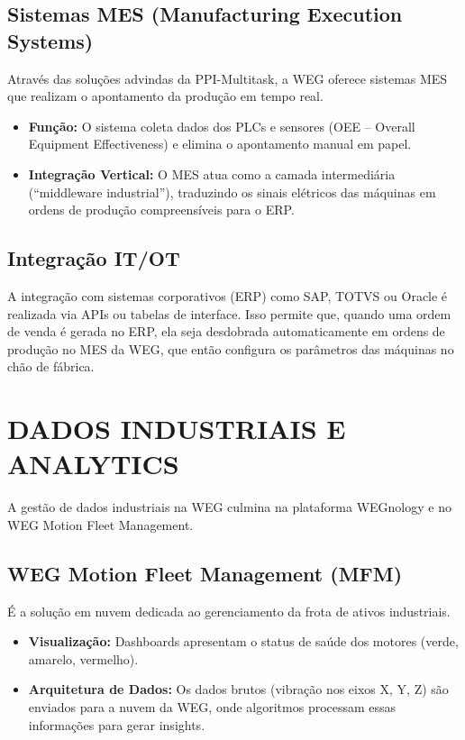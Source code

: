 \documentclass[12pt,a4paper,oneside]{abntex2}
\begin{document}
\section{Sistemas MES (Manufacturing Execution Systems)}

Através das soluções advindas da PPI-Multitask, a WEG oferece sistemas MES que realizam o apontamento da produção em tempo real.

\begin{itemize}
  \item \textbf{Função:} O sistema coleta dados dos PLCs e sensores (OEE -- Overall Equipment Effectiveness) e elimina o apontamento manual em papel.
  \item \textbf{Integração Vertical:} O MES atua como a camada intermediária (``middleware industrial''), traduzindo os sinais elétricos das máquinas em ordens de produção compreensíveis para o ERP.
\end{itemize}

\section{Integração IT/OT}

A integração com sistemas corporativos (ERP) como SAP, TOTVS ou Oracle é realizada via APIs ou tabelas de interface. Isso permite que, quando uma ordem de venda é gerada no ERP, ela seja desdobrada automaticamente em ordens de produção no MES da WEG, que então configura os parâmetros das máquinas no chão de fábrica.

\chapter{DADOS INDUSTRIAIS E ANALYTICS}

A gestão de dados industriais na WEG culmina na plataforma WEGnology e no WEG Motion Fleet Management.

\section{WEG Motion Fleet Management (MFM)}

É a solução em nuvem dedicada ao gerenciamento da frota de ativos industriais.

\begin{itemize}
  \item \textbf{Visualização:} Dashboards apresentam o status de saúde dos motores (verde, amarelo, vermelho).
  \item \textbf{Arquitetura de Dados:} Os dados brutos (vibração nos eixos X, Y, Z) são enviados para a nuvem da WEG, onde algoritmos processam essas informações para gerar insights.
\end{itemize}
\end{document}
